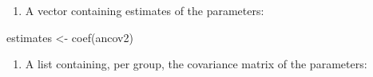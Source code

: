 \documentclass[
]{book}
\newenvironment{Shaded}{\begin{snugshade}}{\end{snugshade}}
\newcommand{\FunctionTok}[1]{\textcolor[rgb]{0.00,0.00,0.00}{#1}}
\newcommand{\NormalTok}[1]{#1}
\newcommand{\OtherTok}[1]{\textcolor[rgb]{0.56,0.35,0.01}{#1}}
\providecommand{\tightlist}{%
  \setlength{\itemsep}{0pt}\setlength{\parskip}{0pt}}
\begin{document}
\begin{enumerate}
\def\labelenumi{\alph{enumi})}
\tightlist
\item
  A vector containing estimates of the parameters:
\end{enumerate}

\begin{Shaded}
\begin{Highlighting}[]
\NormalTok{estimates }\OtherTok{\textless{}{-}} \FunctionTok{coef}\NormalTok{(ancov2)}
\end{Highlighting}
\end{Shaded}

\begin{enumerate}
\def\labelenumi{\alph{enumi})}
\setcounter{enumi}{1}
\tightlist
\item
  A list containing, per group, the covariance
  matrix of the parameters:
\end{enumerate}
\end{document}
